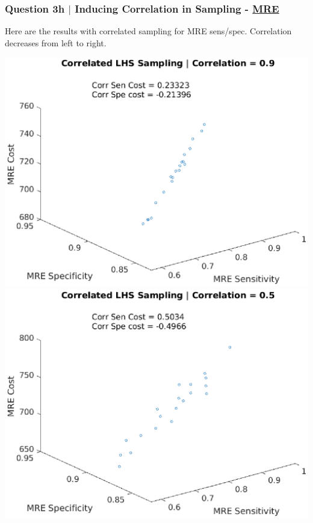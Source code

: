 \documentclass[aspectratio=1610]{beamer}
\begin{document}
\begin{frame}
\frametitle{Question 3h $|$ Inducing Correlation in Sampling - \underline{MRE}}

Here are the results with correlated sampling for MRE sens/spec. Correlation decreases from left to right.

\vspace{1em}
\centering                                                         
\includegraphics[scale = .3]{mrecorr1}
\includegraphics[scale = .3]{mrecorr2}

\end{frame}
\end{document}
